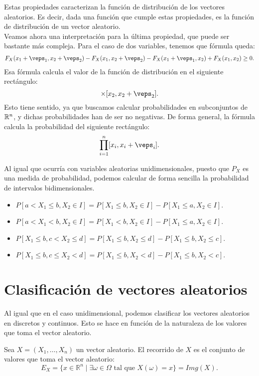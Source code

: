 Estas propiedades caracterizan la función de distribución de los vectores aleatorios. Es decir,
dada una función que cumple estas propiedades, es la función de distribución de un vector aleatorio.\\

Veamos ahora una interpretación para la última propiedad, que puede ser bastante más compleja. Para el caso de dos variables, tenemos que fórmula queda:
\begin{align*}
    F_X(x_1+\veps_1, x_2+\veps_2) - F_X(x_1,x_2+\veps_2) - F_X(x_1+\veps_1,x_2) + F_X(x_1,x_2) \geq 0.
\end{align*}
Esa fórmula calcula el valor de la función de distribución en el siguiente rectángulo:
\begin{equation*}
    [x_1, x_1+\veps_1]\times [x_2, x_2+\veps_2].
\end{equation*}
Esto tiene sentido, ya que buscamos calcular probabilidades en subconjuntos de $\mathbb{R}^n$, y dichas probabilidades han de ser no negativas. De forma general, la fórmula calcula la probabilidad del siguiente rectángulo:
\begin{equation*}
    \prod_{i=1}^n [x_i, x_i+\veps_i].
\end{equation*}

Al igual que ocurría con variables aleatorias unidimensionales, puesto que $P_X$ es una medida de probabilidad, podemos calcular de forma sencilla la probabilidad de intervalos bidimensionales.
\begin{itemize}
    \item $P[a < X_1 \leq b, X_2 \in I] = P[X_1 \leq b, X_2 \in I] - P[X_1 \leq a, X_2 \in I]$.
    \item $P[a < X_1 < b, X_2 \in I] = P[X_1 < b, X_2 \in I] - P[X_1 \leq a, X_2 \in I]$.
    \item $P[X_1 \leq b, c < X_2 \leq d] = P[X_1 \leq b, X_2 \leq d] - P[X_1 \leq b, X_2 \leq c]$.
    \item $P[X_1 \leq b, c \leq X_2 < d] = P[X_1 \leq b, X_2 < d] - P[X_1 \leq b, X_2 < c]$.
\end{itemize}



\section{Clasificación de vectores aleatorios}

Al igual que en el caso unidimensional, podemos clasificar los vectores aleatorios en discretos y continuos. Esto se hace en función de la naturaleza de los valores que toma el vector aleatorio.
\begin{definicion}
    Sea $X=(X_1, \ldots, X_n)$ un vector aleatorio. El recorrido de $X$ es el conjunto de valores que toma el vector aleatorio:
    \begin{equation*}
        E_X = \{x\in \mathbb{R}^n \mid \exists \omega\in \Omega \text{ tal que } X(\omega) = x\}
        = Img(X).
    \end{equation*}
\end{definicion}

